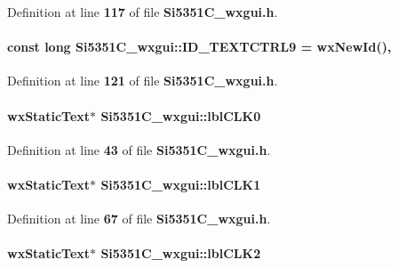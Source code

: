 Definition at line {\bf 117} of file {\bf Si5351\+C\+\_\+wxgui.\+h}.

\paragraph[{I\+D\+\_\+\+T\+E\+X\+T\+C\+T\+R\+L9}]{\setlength{\rightskip}{0pt plus 5cm}const long Si5351\+C\+\_\+wxgui\+::\+I\+D\+\_\+\+T\+E\+X\+T\+C\+T\+R\+L9 = wx\+New\+Id()\hspace{0.3cm}{\ttfamily [static]}, {\ttfamily [protected]}}\label{classSi5351C__wxgui_a21cf85defcfe1a84f55705329378e9cc}


Definition at line {\bf 121} of file {\bf Si5351\+C\+\_\+wxgui.\+h}.

\paragraph[{lbl\+C\+L\+K0}]{\setlength{\rightskip}{0pt plus 5cm}wx\+Static\+Text$\ast$ Si5351\+C\+\_\+wxgui\+::lbl\+C\+L\+K0}\label{classSi5351C__wxgui_ad625173920fd4ff32054dddd7bf3bbfa}


Definition at line {\bf 43} of file {\bf Si5351\+C\+\_\+wxgui.\+h}.

\paragraph[{lbl\+C\+L\+K1}]{\setlength{\rightskip}{0pt plus 5cm}wx\+Static\+Text$\ast$ Si5351\+C\+\_\+wxgui\+::lbl\+C\+L\+K1}\label{classSi5351C__wxgui_a0c90dab72f3058c2a562c2fb3f810fa0}


Definition at line {\bf 67} of file {\bf Si5351\+C\+\_\+wxgui.\+h}.

\paragraph[{lbl\+C\+L\+K2}]{\setlength{\rightskip}{0pt plus 5cm}wx\+Static\+Text$\ast$ Si5351\+C\+\_\+wxgui\+::lbl\+C\+L\+K2}\label{classSi5351C__wxgui_a5d0f42e91d73709b57af0f22ec09cfeb}


